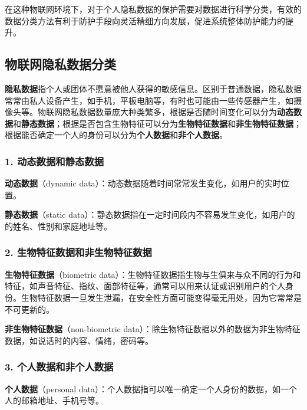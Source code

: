 在这种物联网环境下，对于个人隐私数据的保护需要对数据进行科学分类，有效的数据分类方法有利于防护手段向灵活精细方向发展，促进系统整体防护能力的提升。\par
    

\subsection{物联网隐私数据分类}
\label{common_security}


\textcolor{myblue}{\textbf{隐私数据}}指个人或团体不愿意被他人获得的敏感信息。区别于普通数据，隐私数据常常由私人设备产生，如手机，平板电脑等，有时也可能由一些传感器产生，如摄像头等。物联网隐私数据数量庞大种类繁多\cite{qian2013}，根据是否随时间变化可以分为\textcolor{myblue}{\textbf{动态数据}}和\textcolor{myblue}{\textbf{静态数据}}\cite{min2021}；根据是否包含生物特征可以分为\textcolor{myblue}{\textbf{生物特征数据}}和\textcolor{myblue}{\textbf{非生物特征数据}}\cite{Preserving2019}；根据能否确定一个人的身份可以分为\textcolor{myblue}{\textbf{个人数据}}和\textcolor{myblue}{\textbf{非个人数据}}\cite{Protecting2019}。


\subsubsection{\textcolor{myblue}{\textbf{1. 动态数据和静态数据}}}
\textcolor{myblue}{\textbf{动态数据}}（dynamic data）：动态数据随着时间常常发生变化，如用户的实时位置。

\textcolor{myblue}{\textbf{静态数据}}（static data）：静态数据指在一定时间段内不容易发生变化，如用户的的姓名、性别和家庭地址等。
\subsubsection{\textcolor{myblue}{\textbf{2. 生物特征数据和非生物特征数据}}}
\textcolor{myblue}{\textbf{生物特征数据}}（biometric data）：生物特征数据指生物与生俱来与众不同的行为和特征，如声音特征、指纹、面部特征等，通常可以用来认证或识别用户的个人身份。生物特征数据一旦发生泄漏，在安全性方面可能变得毫无用处，因为它常常是不可更新的。

\textcolor{myblue}{\textbf{非生物特征数据}}（non-biometric data）：除生物特征数据以外的数据为非生物特征数据，如说话时的内容、情绪，密码等。
\subsubsection{\textcolor{myblue}{\textbf{3. 个人数据和非个人数据}}}
\textcolor{myblue}{\textbf{个人数据}}（personal data）：个人数据指可以唯一确定一个人身份的数据，如一个人的邮箱地址、手机号等。

